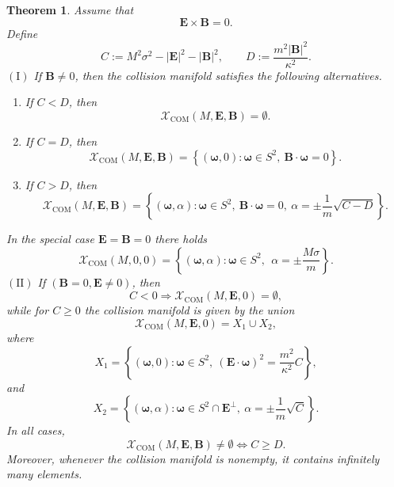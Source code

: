 \documentclass[12pt]{article}
\theoremstyle{plain}
\newtheorem{theorem}{Theorem}[section]
\theoremstyle{definition}
\begin{document}
\begin{theorem}\label{exceptionalcase}
Assume that
\[
{\bm E}\times{\bm B}=0.
\]
Define
\begin{equation}\label{CD}
C:=M^2\sigma^2-|{\bm E}|^2-|{\bm B}|^2,
\qquad
D:=\frac{m^2|{\bm B}|^2}{\kappa^2}.
\end{equation}
$\mathrm{(I)}$ If ${\bm B}\neq0$, then the collision manifold satisfies the following alternatives.
\begin{enumerate}
\item If $C<D$, then
\[
\mathcal X_{\mathrm{COM}}(M,{\bm E},{\bm B})=\emptyset.
\]
\item If $C=D$, then
\[
\mathcal X_{\mathrm{COM}}(M,{\bm E},{\bm B})
=
\left\{
({\bm\omega},0)
:
{\bm\omega}\in S^2,\ 
{\bm B}\cdot{\bm\omega}=0
\right\}.
\]
\item If $C>D$, then
\[
\mathcal X_{\mathrm{COM}}(M,{\bm E},{\bm B})
=
\left\{
({\bm\omega},\alpha)
:
{\bm\omega}\in S^2,\ 
{\bm B}\cdot{\bm\omega}=0,\ 
\alpha=\pm\frac1m\sqrt{C-D}
\right\}.
\]
\end{enumerate}
In the special case ${\bm E}={\bm B}=0$ there holds
\[
\mathcal X_{\mathrm{COM}}(M,0,0)=\left\{
({\bm\omega},\alpha)
:
{\bm\omega}\in S^2,\ \ 
\alpha=\pm\frac{M\sigma}{m}
\right\}.
\]
$\mathrm{(II)}$ If $({\bm B}=0,{\bm E}\neq0)$,
then 
\[
C<0\Rightarrow \mathcal X_{\mathrm{COM}}(M,{\bm E},0)=\emptyset,
\]
while for $C\geq 0$ the collision manifold is given by the union
\[
\mathcal X_{\mathrm{COM}}(M,{\bm E},0)=X_1\cup X_2,
\]
where
\[
X_1=
\left\{
({\bm\omega},0):
{\bm\omega}\in S^2,\ 
({\bm E}\cdot{\bm\omega})^2
=\frac{m^2}{\kappa^2}C
\right\},
\]
and
\[
X_2=
\left\{
({\bm\omega},\alpha):
{\bm\omega}\in S^2\cap{\bm E}^{\perp},\ 
\alpha=\pm\frac1m\sqrt{C}
\right\}.
\]
In all cases,
\[
\mathcal X_{\mathrm{COM}}(M,{\bm E},{\bm B})\neq\emptyset
\iff
C\ge D.
\]
Moreover, whenever the collision manifold is nonempty, it contains infinitely many elements.
\end{theorem}
\end{document}
